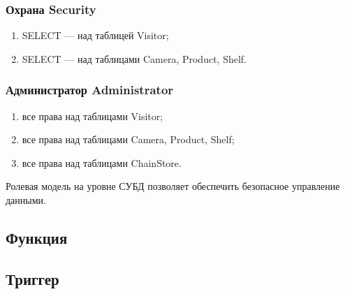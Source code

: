 \subsubsection{Охрана Security}

\begin{enumerate}[label=\arabic*.]
    \item SELECT --- над таблицей Visitor;
    \item SELECT --- над таблицами Camera, Product, Shelf.
\end{enumerate}


\subsubsection{Администратор Administrator}

\begin{enumerate}[label=\arabic*.]
    \item все права над таблицами Visitor;
    \item все права над таблицами Camera, Product, Shelf;
    \item все права над таблицами ChainStore.
\end{enumerate}

Ролевая модель на уровне СУБД позволяет обеспечить безопасное управление данными.

\subsection{Функция}



\subsection{Триггер}
